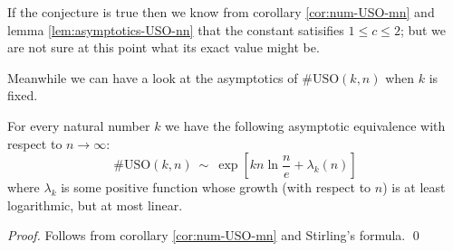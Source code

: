 \documentclass[runningheads,a4paper]{llncs}
\newcommand{\USO}{\ensuremath{\mathrm{USO}}}
\begin{document}
\noindent
If the conjecture is true then we know from corollary \ref{cor:num-USO-mn} and
lemma \ref{lem:asymptotics-USO-nn} that the constant satisifies $1 \le c \le
2$; but we are not sure at this point what its exact value might be.

Meanwhile we can have a look at the asymptotics of $\#\USO(k,n)$ when $k$ is
fixed.

\begin{proposition}
    \label{prop:asymptotics-USO-kn}
    For every natural number $k$ we have the following asymptotic
    equivalence with respect to $n \to \infty$:
    \[
        \#\USO(k,n) ~\sim~ \exp\left[
            k n \ln \frac{n}{e} + \lambda_k(n)
        \right]
    \]
    where $\lambda_k$ is some positive function whose growth (with respect to
    $n$) is at least logarithmic, but at most linear.
\end{proposition}

\begin{proof}
    Follows from corollary \ref{cor:num-USO-mn} and Stirling's formula. \qed
\end{proof}



\end{document}

